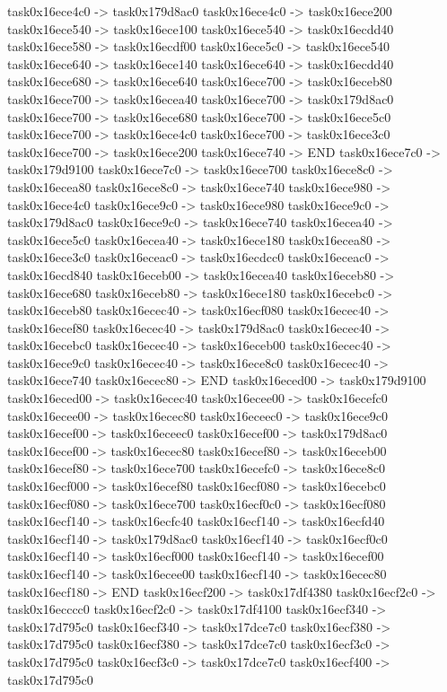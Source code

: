 {	task0x16ece4c0 -> task0x179d8ac0
	task0x16ece4c0 -> task0x16ece200
	task0x16ece540 -> task0x16ece100
	task0x16ece540 -> task0x16ecdd40
	task0x16ece580 -> task0x16ecdf00
	task0x16ece5c0 -> task0x16ece540
	task0x16ece640 -> task0x16ece140
	task0x16ece640 -> task0x16ecdd40
	task0x16ece680 -> task0x16ece640
	task0x16ece700 -> task0x16eceb80
	task0x16ece700 -> task0x16ecea40
	task0x16ece700 -> task0x179d8ac0
	task0x16ece700 -> task0x16ece680
	task0x16ece700 -> task0x16ece5c0
	task0x16ece700 -> task0x16ece4c0
	task0x16ece700 -> task0x16ece3c0
	task0x16ece700 -> task0x16ece200
	task0x16ece740 -> END
	task0x16ece7c0 -> task0x179d9100
	task0x16ece7c0 -> task0x16ece700
	task0x16ece8c0 -> task0x16ecea80
	task0x16ece8c0 -> task0x16ece740
	task0x16ece980 -> task0x16ece4c0
	task0x16ece9c0 -> task0x16ece980
	task0x16ece9c0 -> task0x179d8ac0
	task0x16ece9c0 -> task0x16ece740
	task0x16ecea40 -> task0x16ece5c0
	task0x16ecea40 -> task0x16ece180
	task0x16ecea80 -> task0x16ece3c0
	task0x16eceac0 -> task0x16ecdcc0
	task0x16eceac0 -> task0x16ecd840
	task0x16eceb00 -> task0x16ecea40
	task0x16eceb80 -> task0x16ece680
	task0x16eceb80 -> task0x16ece180
	task0x16ecebc0 -> task0x16eceb80
	task0x16ecec40 -> task0x16ecf080
	task0x16ecec40 -> task0x16ecef80
	task0x16ecec40 -> task0x179d8ac0
	task0x16ecec40 -> task0x16ecebc0
	task0x16ecec40 -> task0x16eceb00
	task0x16ecec40 -> task0x16ece9c0
	task0x16ecec40 -> task0x16ece8c0
	task0x16ecec40 -> task0x16ece740
	task0x16ecec80 -> END
	task0x16eced00 -> task0x179d9100
	task0x16eced00 -> task0x16ecec40
	task0x16ecee00 -> task0x16ecefc0
	task0x16ecee00 -> task0x16ecec80
	task0x16eceec0 -> task0x16ece9c0
	task0x16ecef00 -> task0x16eceec0
	task0x16ecef00 -> task0x179d8ac0
	task0x16ecef00 -> task0x16ecec80
	task0x16ecef80 -> task0x16eceb00
	task0x16ecef80 -> task0x16ece700
	task0x16ecefc0 -> task0x16ece8c0
	task0x16ecf000 -> task0x16ecef80
	task0x16ecf080 -> task0x16ecebc0
	task0x16ecf080 -> task0x16ece700
	task0x16ecf0c0 -> task0x16ecf080
	task0x16ecf140 -> task0x16ecfc40
	task0x16ecf140 -> task0x16ecfd40
	task0x16ecf140 -> task0x179d8ac0
	task0x16ecf140 -> task0x16ecf0c0
	task0x16ecf140 -> task0x16ecf000
	task0x16ecf140 -> task0x16ecef00
	task0x16ecf140 -> task0x16ecee00
	task0x16ecf140 -> task0x16ecec80
	task0x16ecf180 -> END
	task0x16ecf200 -> task0x17df4380
	task0x16ecf2c0 -> task0x16ecccc0
	task0x16ecf2c0 -> task0x17df4100
	task0x16ecf340 -> task0x17d795c0
	task0x16ecf340 -> task0x17dce7c0
	task0x16ecf380 -> task0x17d795c0
	task0x16ecf380 -> task0x17dce7c0
	task0x16ecf3c0 -> task0x17d795c0
	task0x16ecf3c0 -> task0x17dce7c0
	task0x16ecf400 -> task0x17d795c0
}

